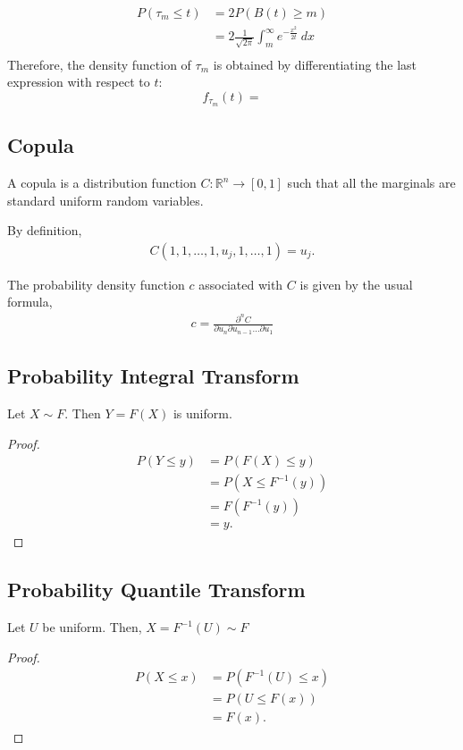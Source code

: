 \documentclass{amsart}
\theoremstyle{plain}
\numberwithin{equation}{section}
\begin{document}
\begin{align}
P(\tau_m \leq t) &= 2 P(B(t) \geq m )\\
                 &= 2 \frac{1}{\sqrt{2\pi}} \int_{m}^{\infty} e^{-\frac{x^2}{2t}} \: dx\\								
\end{align}
Therefore, the density function of
$\tau_m$ is obtained by differentiating the last expression 
with respect to $t$:
\begin{equation}
f_{\tau_m} (t) = 
\end{equation}
\subsection{Copula}
A copula is a distribution function $C: \mathbb{R}^n \to [0, 1]$ such that 
all the marginals are standard uniform random variables.

By definition,
\begin{align*}
C(1, 1, \ldots, 1, u_j, 1, \ldots, 1) = u_j.
\end{align*}

The probability density function $c$ associated with $C$ is given 
by the usual formula,
\begin{align*}
c = \frac{\partial^n C}{\partial u_n \partial u_{n-1} \ldots \partial u_1 }
\end{align*} 

\subsection{Probability Integral Transform}
Let $X \sim F$. Then $Y = F(X)$ is uniform. 
\begin{proof}
\begin{align*}
P(Y \leq y ) &= P(F(X) \leq y )\\
&= P(X \leq F^{-1}(y))\\
&= F(F^{-1}(y))\\
&= y.
\end{align*}

\end{proof}

\subsection{Probability Quantile Transform}
Let $U$ be uniform. Then, $X=F^{-1}(U) \sim F$
\begin{proof}
\begin{align*}
P(X \leq x ) &= P(F^{-1}(U) \leq x )\\
&= P(U \leq F(x))\\
&= F(x).
\end{align*}
\end{proof}
\end{document}

